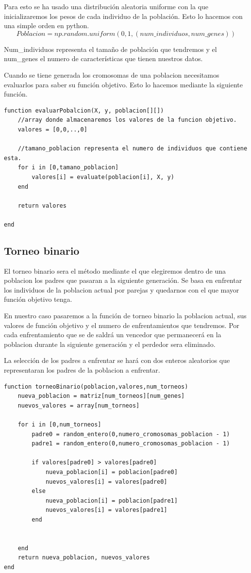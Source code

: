 \documentclass[titlepage]{article}
\begin{document}
	Para esto se ha usado una distribución aleatoria uniforme con la que  inicializaremos los pesos de cada individuo de la población. 
	Esto lo hacemos con una simple orden en python. 
	$$
		Poblacion = np.random.uniform(0,1,(num\_individuos, num\_genes))
	$$ 
	
	Num\_individuos representa el tamaño de población que tendremos y el num\_genes el numero de características que tienen nuestros datos.
	
	Cuando se tiene generada los cromosomas de una poblacion necesitamos evaluarlos para saber su función objetivo. Esto lo hacemos mediante la siguiente función.
	
	\begin{lstlisting}
function evaluarPobalcion(X, y, poblacion[][])
	//array donde almacenaremos los valores de la funcion objetivo.
	valores = [0,0,..,0]
		
	//tamano_poblacion representa el numero de individuos que contiene esta.
	for i in [0,tamano_poblacion]
		valores[i] = evaluate(poblacion[i], X, y)
	end
		
	return valores
			
end
	\end{lstlisting}
	
	\subsection{Torneo binario}
	
	El torneo binario sera el método mediante el que elegiremos dentro de una poblacion los padres que pasaran a la siguiente generación.
	Se basa en enfrentar los individuos de la poblacion actual por parejas y quedarnos con el que mayor función objetivo tenga. 
	
	En nuestro caso pasaremos a la función de torneo binario la poblacion actual, sus valores de función objetivo y el numero de enfrentamientos que tendremos. Por cada enfrentamiento que se de saldrá un vencedor que permanecerá en la poblacion durante la siguiente generación y el perdedor sera eliminado. 
	
	La selección de los padres a enfrentar se hará con dos enteros aleatorios que representaran los padres de la poblacion a enfrentar.
	\begin{lstlisting}
function torneoBinario(poblacion,valores,num_torneos)
	nueva_poblacion = matriz[num_torneos][num_genes]
	nuevos_valores = array[num_torneos]
	
	for i in [0,num_torneos]
		padre0 = random_entero(0,numero_cromosomas_poblacion - 1)
		padre1 = random_entero(0,numero_cromosomas_poblacion - 1)
		
		if valores[padre0] > valores[padre0]
			nueva_poblacion[i] = poblacion[padre0]
			nuevos_valores[i] = valores[padre0]
		else
			nueva_poblacion[i] = poblacion[padre1]
			nuevos_valores[i] = valores[padre1]
		end
		
		
	end
	return nueva_poblacion, nuevos_valores
end
	\end{lstlisting}
	
\end{document}
